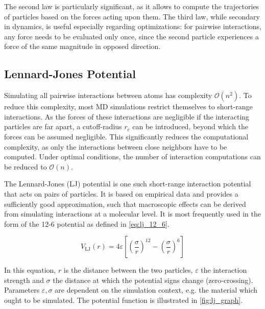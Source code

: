 The second law is particularly significant, as it allows to compute the trajectories of particles based on the forces acting upon them. The third law, while secondary in dynamics, is useful especially regarding optimizations: for pairwise interactions, any force needs to be evaluated only once, since the second particle experiences a force of the same magnitude in opposed direction. \cite{Gratl2021}

\subsection{Lennard-Jones Potential}
\label{sec:lj_potential}
Simulating all pairwise interactions between atoms has complexity $\mathcal{O}\left(n^2\right)$. To reduce this complexity, most MD simulations restrict themselves to short-range interactions. As the forces of these interactions are negligible if the interacting particles are far apart, a cutoff-radius $r_c$ can be introduced, beyond which the forces can be assumed negligible. This significantly reduces the computational complexity, as only the interactions between close neighbors have to be computed. Under optimal conditions, the number of interaction computations can be reduced to $\mathcal{O}\left(n\right)$. \cite{Gratl2021}

The Lennard-Jones (LJ) potential is one such short-range interaction potential that acts on pairs of particles. It is based on empirical data and provides a sufficiently good approximation, such that macroscopic effects can be derived from simulating interactions at a molecular level.
It is most frequently used in the form of the 12-6 potential as defined in \eqref{eq:lj_12_6}.

\begin{equation}
	V_{\text{LJ}}(r)=4\varepsilon\left[\left(\frac{\sigma}{r}\right)^{12}-\left(\frac{\sigma}{r}\right)^{6}\right]\label{eq:lj_12_6}
\end{equation}

In this equation, $r$ is the distance between the two particles, $\varepsilon$ the interaction strength and $\sigma$ the distance at which the potential signs change (zero-crossing). Parameters $\varepsilon, \sigma$ are dependent on the simulation context, e.g. the material which ought to be simulated. The potential function is illustrated in \autoref{fig:lj_graph}. \cite{Wang2020, Lenhard2024}


